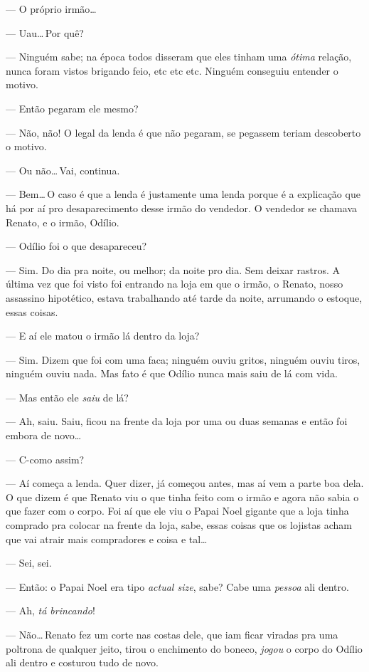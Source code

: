 --- O próprio irmão\ldots

--- Uau\ldots\,Por quê?

--- Ninguém sabe; na época todos disseram que eles tinham uma \emph{ótima} relação, nunca foram vistos brigando feio, etc etc etc. Ninguém conseguiu entender o motivo.

--- Então pegaram ele mesmo?

--- Não, não! O legal da lenda é que não pegaram, se pegassem teriam descoberto o motivo.

--- Ou não\ldots\,Vai, continua.

--- Bem\ldots\,O caso é que a lenda é justamente uma lenda porque é a explicação que há por aí pro desaparecimento desse irmão do vendedor. O vendedor se chamava Renato, e o irmão, Odílio.

--- Odílio foi o que desapareceu?

--- Sim. Do dia pra noite, ou melhor; da noite pro dia. Sem deixar rastros. A última vez que foi visto foi entrando na loja em que o irmão, o Renato, nosso assassino hipotético, estava trabalhando até tarde da noite, arrumando o estoque, essas coisas.

--- E aí ele matou o irmão lá dentro da loja?

--- Sim. Dizem que foi com uma faca; ninguém ouviu gritos, ninguém ouviu tiros, ninguém ouviu nada. Mas fato é que Odílio nunca mais saiu de lá com vida.

--- Mas então ele \emph{saiu} de lá?

--- Ah, saiu. Saiu, ficou na frente da loja por uma ou duas semanas e então foi embora de novo\ldots

--- C-como assim?

--- Aí começa a lenda. Quer dizer, já começou antes, mas aí vem a parte boa dela. O que dizem é que Renato viu o que tinha feito com o irmão e agora não sabia o que fazer com o corpo. Foi aí que ele viu o Papai Noel gigante que a loja tinha comprado pra colocar na frente da loja, sabe, essas coisas que os lojistas acham que vai atrair mais compradores e coisa e tal\ldots

--- Sei, sei.

--- Então: o Papai Noel era tipo \foreignlanguage{english}{\emph{actual size}}, sabe? Cabe uma \emph{pessoa} ali dentro.

--- Ah, \emph{tá brincando}!

--- Não\ldots\,Renato fez um corte nas costas dele, que iam ficar viradas pra uma poltrona de qualquer jeito, tirou o enchimento do boneco, \emph{jogou} o corpo do Odílio ali dentro e costurou tudo de novo.

